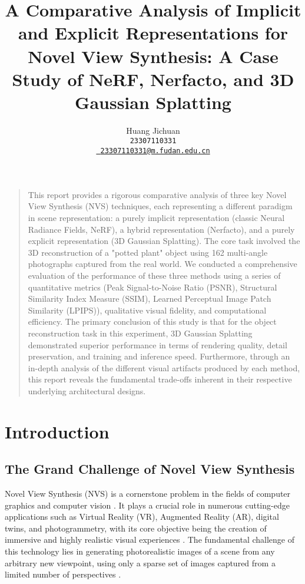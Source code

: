 \documentclass[11pt]{article}
\title{\vspace{2em}\textbf{A Comparative Analysis of Implicit and Explicit Representations for Novel View Synthesis: A Case Study of NeRF, Nerfacto, and 3D Gaussian Splatting}\vspace{6em}}
\author{%
  \vspace{1em}
  {\LARGE Huang Jichuan} \\
  \vspace{0.5em}
  {\Large \texttt{23307110331}} \\
  \vspace{0.5em}
  {\Large \href{mailto: 23307110331@m.fudan.edu.cn}{\texttt{ 23307110331@m.fudan.edu.cn}}}
}
\date{} %
\renewenvironment{abstract}
  {
    \begin{center}
      {\LARGE\bfseries\abstractname}
    \end{center}
    \begin{quotation}
    \noindent %
  }
  {
    \end{quotation}
  }
\begin{document}
\maketitle

\newpage
\begin{abstract}
\normalsize
This report provides a rigorous comparative analysis of three key Novel View Synthesis (NVS) techniques, each representing a different paradigm in scene representation: a purely implicit representation (classic Neural Radiance Fields, NeRF), a hybrid representation (Nerfacto), and a purely explicit representation (3D Gaussian Splatting). The core task involved the 3D reconstruction of a "potted plant" object using 162 multi-angle photographs captured from the real world. We conducted a comprehensive evaluation of the performance of these three methods using a series of quantitative metrics (Peak Signal-to-Noise Ratio (PSNR), Structural Similarity Index Measure (SSIM), Learned Perceptual Image Patch Similarity (LPIPS)), qualitative visual fidelity, and computational efficiency. The primary conclusion of this study is that for the object reconstruction task in this experiment, 3D Gaussian Splatting demonstrated superior performance in terms of rendering quality, detail preservation, and training and inference speed. Furthermore, through an in-depth analysis of the different visual artifacts produced by each method, this report reveals the fundamental trade-offs inherent in their respective underlying architectural designs.
\end{abstract}

\newpage
\tableofcontents %
\thispagestyle{empty} %

\newpage
\setcounter{page}{1} %

\section{Introduction}

\subsection{The Grand Challenge of Novel View Synthesis}
Novel View Synthesis (NVS) is a cornerstone problem in the fields of computer graphics and computer vision \cite{mildenhall2020nerf}. It plays a crucial role in numerous cutting-edge applications such as Virtual Reality (VR), Augmented Reality (AR), digital twins, and photogrammetry, with its core objective being the creation of immersive and highly realistic visual experiences \cite{gennerf2023}. The fundamental challenge of this technology lies in generating photorealistic images of a scene from any arbitrary new viewpoint, using only a sparse set of images captured from a limited number of perspectives \cite{mildenhall2020nerf}.
\end{document}
